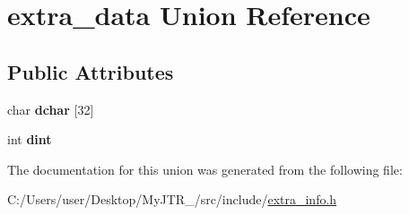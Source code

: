 \hypertarget{unionextra__data}{}\section{extra\+\_\+data Union Reference}
\label{unionextra__data}
\subsection*{Public Attributes}
\begin{DoxyCompactItemize}
\item 
\mbox{\label{unionextra__data_af698a037578438f2c2aa02cae70b8a85}} 
char {\bfseries dchar} \mbox{[}32\mbox{]}
\item 
\mbox{\label{unionextra__data_a53ba6db7c2cdcd0c6155a74a633eca7b}} 
int {\bfseries dint}
\end{DoxyCompactItemize}


The documentation for this union was generated from the following file\+:\begin{DoxyCompactItemize}
\item 
C\+:/\+Users/user/\+Desktop/\+My\+J\+T\+R\+\_/src/include/\mbox{\hyperlink{extra__info_8h}{extra\+\_\+info.\+h}}\end{DoxyCompactItemize}
